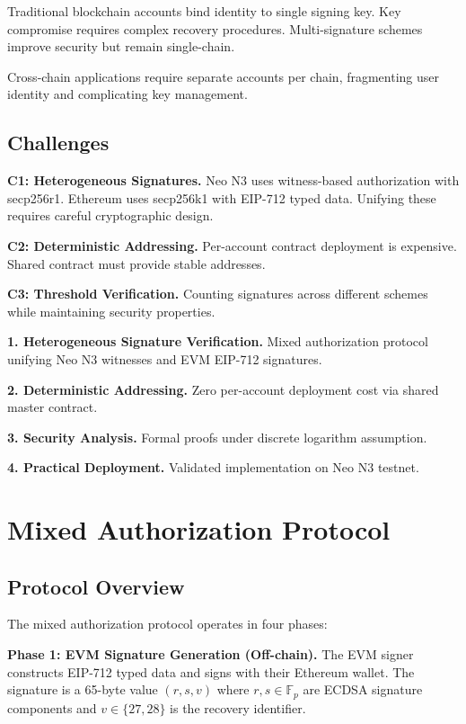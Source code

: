 \documentclass[10pt,twocolumn]{article}
\begin{document}
Traditional blockchain accounts bind identity to single signing key. Key compromise requires complex recovery procedures. Multi-signature schemes improve security but remain single-chain.

Cross-chain applications require separate accounts per chain, fragmenting user identity and complicating key management.

\subsection{Challenges}

\textbf{C1: Heterogeneous Signatures.} Neo N3 uses witness-based authorization with secp256r1. Ethereum uses secp256k1 with EIP-712 typed data. Unifying these requires careful cryptographic design.

\textbf{C2: Deterministic Addressing.} Per-account contract deployment is expensive. Shared contract must provide stable addresses.

\textbf{C3: Threshold Verification.} Counting signatures across different schemes while maintaining security properties.

\textbf{1. Heterogeneous Signature Verification.} Mixed authorization protocol unifying Neo N3 witnesses and EVM EIP-712 signatures.

\textbf{2. Deterministic Addressing.} Zero per-account deployment cost via shared master contract.

\textbf{3. Security Analysis.} Formal proofs under discrete logarithm assumption.

\textbf{4. Practical Deployment.} Validated implementation on Neo N3 testnet.

\section{Mixed Authorization Protocol}

\subsection{Protocol Overview}

The mixed authorization protocol operates in four phases:

\textbf{Phase 1: EVM Signature Generation (Off-chain).} The EVM signer constructs EIP-712 typed data and signs with their Ethereum wallet. The signature is a 65-byte value $(r, s, v)$ where $r, s \in \mathbb{F}_p$ are ECDSA signature components and $v \in \{27, 28\}$ is the recovery identifier.
\end{document}
